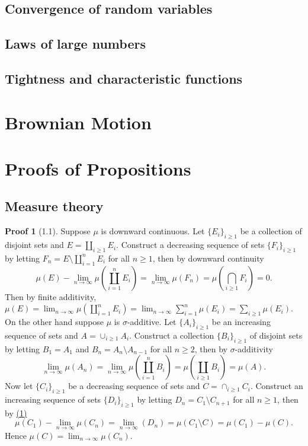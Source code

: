 \documentclass[hidelinks,11pt]{article}
\theoremstyle{definition}
\theoremstyle{dotless}
\theoremstyle{named}
\newtheorem*{prof}{Proof}
\theoremstyle{remark}
\DeclareMathOperator{\1}{\mathbf{1}}
\begin{document}
\subsection{Convergence of random variables}

\subsection{Laws of large numbers}

\subsection{Tightness and characteristic functions}

\newpage
\section{Brownian Motion}

\newpage\appendix
\section{Proofs of Propositions}

\subsection{Measure theory}

\begin{prof}[1.1]
Suppose $\mu$ is downward continuous. Let $\{E_i\}_{i\geq1}$ be a collection of disjoint sets and $E=\amalg_{i\geq1}E_i$. Construct a decreasing sequence of sets $\{F_i\}_{i\geq1}$ by letting
$F_n=E\setminus\amalg_{i=1}^nE_i$ for all $n\geq1$, then by downward continuity
\[\mu(E)-\lim_{n\to\infty}\mu(\coprod_{i=1}^nE_i)=\lim_{n\to\infty}\mu(F_n)=\mu(\bigcap_{i\geq1}F_i)=0.\]
Then by finite additivity, $\mu(E)=\lim_{n\to\infty}\mu(\amalg_{i=1}^nE_i)=\lim_{n\to\infty}\sum_{i=1}^n\mu(E_i)=\sum_{i\geq1}\mu(E_i)$.\medbreak
On the other hand suppose $\mu$ is $\sigma$-additive.
Let $\{A_i\}_{i\geq1}$ be an increasing sequence of sets and $A=\cup_{i\geq1}A_i$. Construct a collection $\{B_i\}_{i\geq1}$ of disjoint sets by letting $B_1=A_1$ and $B_n=A_n\setminus A_{n-1}$ for all $n\geq2$, then by $\sigma$-additivity
\begin{equation}\label{(1)}
    \lim_{n\to\infty}\mu(A_n)=\lim_{n\to\infty}\mu(\coprod_{i=1}^nB_i)=\mu(\coprod_{i\geq1}B_i)=\mu(A).
\end{equation}
Now let $\{C_i\}_{i\geq1}$ be a decreasing sequence of sets and $C=\cap_{i\geq1}C_i$. Construct an increasing sequence of sets $\{D_i\}_{i\geq1}$ by letting $D_n=C_1\setminus C_{n+1}$ for all $n\geq1$, then by \hyperref[(1)]{(1)}
\[\mu(C_1)-\lim_{n\to\infty}\mu(C_n)=\lim_{n\to\infty}(D_n)=\mu(C_1\setminus C)=\mu(C_1)-\mu(C).\]
Hence $\mu(C)=\lim_{n\to\infty}\mu(C_n)$.
\end{prof}
\end{document}
